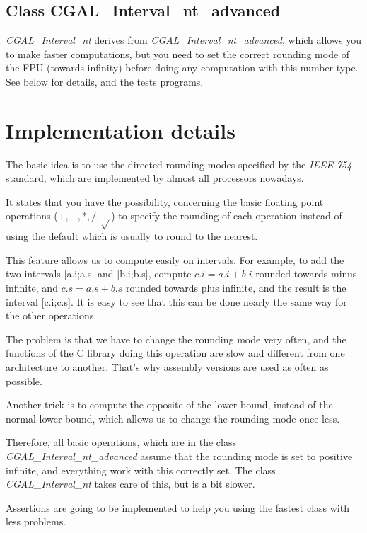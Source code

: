 \documentclass{book}
\begin{document}
\subsection {Class CGAL\_Interval\_nt\_advanced}

{\it CGAL\_Interval\_nt} derives from {\it CGAL\_Interval\_nt\_advanced},
which allows you to make faster computations, but you need to set the correct
rounding mode of the FPU (towards infinity) before doing any computation with
this number type.  See below for details, and the tests programs.


\section{Implementation details}

The basic idea is to use the directed rounding modes specified by the {\it
IEEE 754} standard, which are implemented by almost all processors nowadays.

It states that you have the possibility, concerning the basic floating point
operations ($+,-,*,/,\sqrt{}$) to specify the rounding of each operation
instead of using the default which is usually to round to the nearest.

This feature allows us to compute easily on intervals.  For example, to add the
two intervals [a.i;a.s] and [b.i;b.s], compute $c.i=a.i+b.i$ rounded towards
minus infinite, and $c.s=a.s+b.s$ rounded towards plus infinite, and the result
is the interval [c.i;c.s].  It is easy to see that this can be done nearly the
same way for the other operations.

\smallskip

The problem is that we have to change the rounding mode very often, and the
functions of the C library doing this operation are slow and different from
one architecture to another.  That's why assembly versions are used as often
as possible.

Another trick is to compute the opposite of the lower bound, instead of the
normal lower bound, which allows us to change the rounding mode once less.

Therefore, all basic operations, which are in the class {\it
CGAL\_Interval\_nt\_advanced} assume that the rounding mode is set to positive
infinite, and everything work with this correctly set.  The class {\it
CGAL\_Interval\_nt} takes care of this, but is a bit slower.

Assertions are going to be implemented to help you using the fastest class
with less problems.
\end{document}
